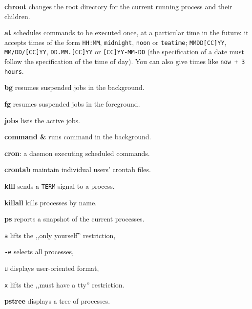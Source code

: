 \begin{enumx}
	\item [\cmd] \textbf{chroot} changes the root directory 
	for the current running process and their children.
\end{enumx}

\begin{enumx}
	\item [\cmd] \textbf{at} schedules commands to be executed once, 
	at a particular time in the future: it accepts times of the form 
	\texttt{HH:MM}, \texttt{midnight}, \texttt{noon} or \texttt{teatime}; 
	\texttt{MMDD[CC]YY}, \texttt{MM/DD/[CC]YY}, \texttt{DD.MM.[CC]YY} or 
	\texttt{[CC]YY-MM-DD} (the specification of a date 
	must follow the specification of the time of day).
	You can also give times like \texttt{now + 3 hours}.
\end{enumx}

\begin{enumx}
	\item [\cmd] \textbf{bg} resumes suspended jobs in the background.
	\item [\cmd] \textbf{fg} resumes suspended jobs in the foreground.
	\item [\cmd] \textbf{jobs} lists the active jobs.
	\item [\cmd] \textbf{command \&} runs command in the background.
\end{enumx}

\begin{enumx}
	\item [\cmd] \textbf{cron}: a daemon executing scheduled commands.
	\item [\cmd] \textbf{crontab} maintain individual users' crontab files.
\end{enumx}

\begin{enumx}
	\item [\cmd] \textbf{kill} sends a \texttt{TERM} signal to a process.
	\item [\cmd] \textbf{killall} kills processes by name.
\end{enumx}

\begin{enumx}
	\item [\cmd] \textbf{ps} reports a snapshot of the current processes.
	\item [\texttt{a}] lifts the ,,only yourself'' restriction,
	\item [\texttt{-e}] selects all processes,
	\item [\texttt{u}] displays user-oriented format,
	\item [\texttt{x}] lifts the ,,must have a tty'' restriction. 
	\item [\cmd] \textbf{pstree} displays a tree of processes.
\end{enumx}

